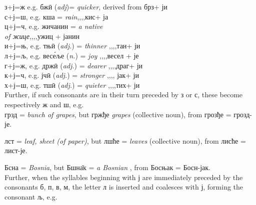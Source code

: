 \newpage

\noindent з+ј=ж e.g. бж\={и} ({\it adj})= \emph{quicker}, derived from брз\quad+ ји\\
с+ј=ш, e.g. кша \femn = \emph{rain}\qquad\qquad,,\qquad ,,\quad кис\quad+ ја\\
ц+ј=ч, e.g. жичанин \masc = \emph{a native}\\
\hspace*{0.42\linewidth} \emph{of жице},,\qquad ,,\quad ужиц + јанин\\
и+ј=њ, e.g. тњ\={и} ({\it adj.}) = \emph{thinner} \quad ,,\qquad ,,\quad тан\quad + ји\\
л+ј=љ, e.g. вес\'{е}ље ({\it n.}) = \emph{joy} \quad\qquad,,\qquad ,,\quad весел + је\\
г+ј=ж, e.g. држ\={и} ({\it adj.}) = \emph{dearer} \quad,,\qquad ,,\quad драг\quad+ ји\\
к+ј=ч, e.g. јч\={и} ({\it adj.}) = \emph{stronger} \quad ,,\qquad ,, \quad јак\quad + ји\\
х+ј=ш, e.g. тш\={и} ({\it adj.}) = \emph{quieter} \quad,,\qquad ,,\quad тих\quad + ји\\

Further, if such consonants are in their turn preceded by з or с, these become
respectively ж and ш, e.g.\\

грзд \masc = \emph{bunch of grapes}, but гржђе \neut \emph{grapes} (collective noun), from грозђе = грозд-је.

лст \masc = \emph{leaf, sheet (of paper)}, but лшће \neut = \emph{leaves} (collective noun), from лисће = лист-је.

Бсна \femn = \emph{Bosnia}, but Бшн\={а}к \masc = \emph{a Bosnian} \masc, from Босњак = Босн-јак.\\

Further, when the syllables beginning with ј are immediately preceded by the consonants б, п, в, м, the letter л is inserted and coalesces with ј, forming the consonant љ, e.g.
